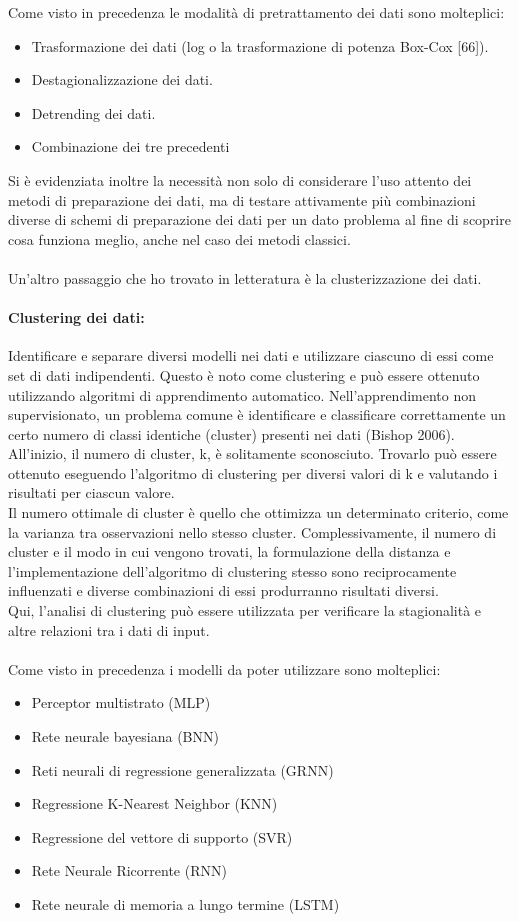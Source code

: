 \documentclass[12pt,a4paper]{report}
\begin{document}
Come visto in precedenza le modalità di pretrattamento dei dati sono molteplici:
\begin{itemize}
    \item Trasformazione dei dati (log o la trasformazione di potenza Box-Cox [66]).
    \item Destagionalizzazione dei dati.
    \item Detrending dei dati.
    \item Combinazione dei tre precedenti
\end{itemize}

Si è evidenziata inoltre la necessità non solo di considerare l'uso attento dei metodi di preparazione dei dati, ma di testare attivamente più combinazioni diverse di schemi di preparazione dei dati per un dato problema al fine di scoprire cosa funziona meglio, anche nel caso dei metodi classici.\\
\\
Un'altro passaggio che ho trovato in letteratura è la clusterizzazione dei dati.
\paragraph*{Clustering dei dati:}
Identificare e separare diversi modelli nei dati e utilizzare ciascuno di essi come set di dati indipendenti. Questo è noto come clustering e può essere ottenuto utilizzando algoritmi di apprendimento automatico.
Nell'apprendimento non supervisionato, un problema comune è identificare e classificare correttamente un certo numero di classi identiche (cluster) presenti nei dati (Bishop 2006). All'inizio, il numero di cluster, k, è solitamente sconosciuto. Trovarlo può essere ottenuto eseguendo l'algoritmo di clustering per diversi valori di k e valutando i risultati per ciascun valore.\\
Il numero ottimale di cluster è quello che ottimizza un determinato criterio, come la varianza tra osservazioni nello stesso cluster.
Complessivamente, il numero di cluster e il modo in cui vengono trovati, la formulazione della distanza e l'implementazione dell'algoritmo di clustering stesso sono reciprocamente influenzati e diverse combinazioni di essi produrranno risultati diversi.\\
Qui, l'analisi di clustering può essere utilizzata per verificare la stagionalità e altre relazioni tra i dati di input.\\
\\
Come visto in precedenza i modelli da poter utilizzare sono molteplici:
\begin{itemize}
    \item Perceptor multistrato (MLP)
    \item Rete neurale bayesiana (BNN)
    \item Reti neurali di regressione generalizzata (GRNN)
    \item Regressione K-Nearest Neighbor (KNN)
    \item Regressione del vettore di supporto (SVR)
    \item Rete Neurale Ricorrente (RNN)
    \item Rete neurale di memoria a lungo termine (LSTM)
\end{itemize}
\end{document}
